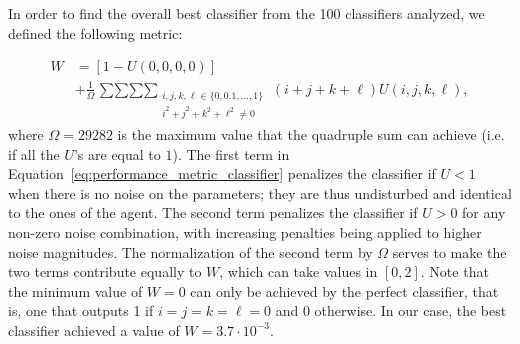 In order to find the overall best classifier from the 100 classifiers analyzed, we defined the following metric:  


\begin{equation}
\begin{split}
W &= \left[1 - U\left(0,0,0,0\right)\right] \\
& + \frac{1}{\Omega} \mathop{\sum \sum \sum \sum}_{\begin{smallmatrix} i, j, k, \ell \in \lbrace 0, 0.1, \dots, 1 \rbrace \\ i^2 + j^2+k^2 + \ell^2 \neq 0 \end{smallmatrix}} \left(i+j+k+\ell\right) U\left(i,j,k,\ell\right),
\end{split}
\label{eq:performance_metric_classifier}
\end{equation}
where $\Omega=29282$ is the maximum value that the quadruple sum can achieve (i.e. if all the $U$'s are equal to $1$). The first term in Equation~\ref{eq:performance_metric_classifier} penalizes the classifier if $U<1$ when there is no noise on the parameters; they are thus undisturbed and identical to the ones of the agent. The second term penalizes the classifier if $U>0$ for any non-zero noise combination, with increasing penalties being applied to higher noise magnitudes. The normalization of the second term by $\Omega$ serves to make the two terms contribute equally to $W$, which can take values in $[0,2]$. Note that the minimum value of $W=0$ can only be achieved by the perfect classifier, that is, one that outputs 1 if $i=j=k=\ell=0$ and $0$ otherwise. In our case, the best classifier achieved a value of $W=3.7\cdot 10^{-3}$.


